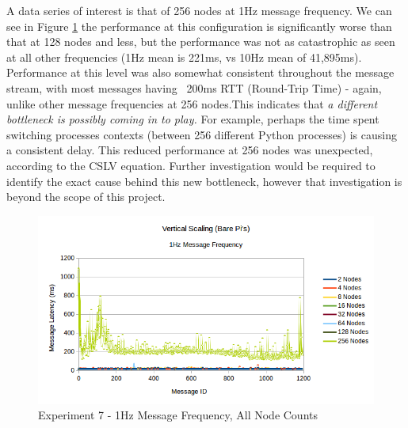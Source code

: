 \documentclass[../dissertation.tex]{subfiles}
\begin{document}
A data series of interest is that of 256 nodes at 1Hz message frequency. We can see in Figure \ref{exp7-further-1hz-all-nodes} the performance at this configuration is significantly worse than that at 128 nodes and less, but the performance was not as catastrophic as seen at all other frequencies (1Hz mean is 221ms, vs 10Hz mean of 41,895ms). Performance at this level was also somewhat consistent throughout the message stream, with most messages having ~200ms RTT (Round-Trip Time) - again, unlike other message frequencies at 256 nodes.This indicates that  \textit{a different bottleneck is possibly coming in to play.} For example, perhaps the time spent switching processes contexts (between 256 different Python processes) is causing a consistent delay. This reduced performance at 256 nodes was unexpected, according to the CSLV equation. Further investigation would be required to identify the exact cause behind this new bottleneck, however that investigation is beyond the scope of this project.

\begin{figure}[H]
\centering
\includegraphics[width=\textwidth]{images/experiment8/vertical_scaling_1hz_all_node_counts.png}
\caption{Experiment 7 - 1Hz Message Frequency, All Node Counts}
\label{exp7-further-1hz-all-nodes}
\end{figure}
\end{document}

